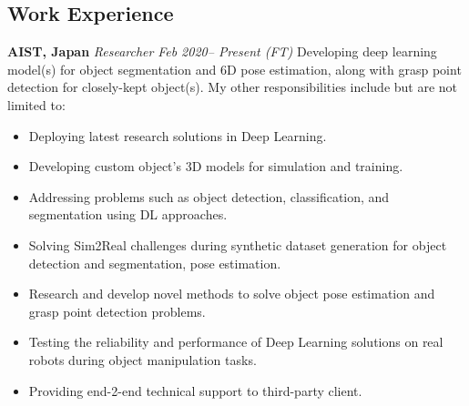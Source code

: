 \documentclass[10pt, oneside]{article} %
\begin{document}
\begin{sloppypar}


\end{sloppypar}%


\begin{paracol}{2} %

\section{Work Experience}

\workposition
{\textbf{AIST, Japan}}
{\textit{Researcher} \hfill \footnotesize{\textit{Feb 2020-- Present \hspace{10pt}(FT)}}}
{Developing deep learning model(s) for object segmentation and 6D pose estimation, along with grasp point detection for closely-kept object(s). My other responsibilities include but are not limited to:}
\begin{itemize}[leftmargin=*, noitemsep, topsep=0pt]
    \item Deploying latest research solutions in Deep Learning.
    \item Developing custom object's 3D models for simulation and training.
    \item Addressing problems such as object detection, classification, and segmentation using DL approaches.
    \item Solving Sim2Real challenges during synthetic dataset generation for object detection and segmentation, pose estimation.
    \item Research and develop novel methods to solve object pose estimation and grasp point detection problems.
    \item Testing the reliability and performance of Deep Learning solutions on real robots during object manipulation tasks.
    \item Providing end-2-end technical support to third-party client.
    \newline
\end{itemize}


\end{paracol}
\end{document}
